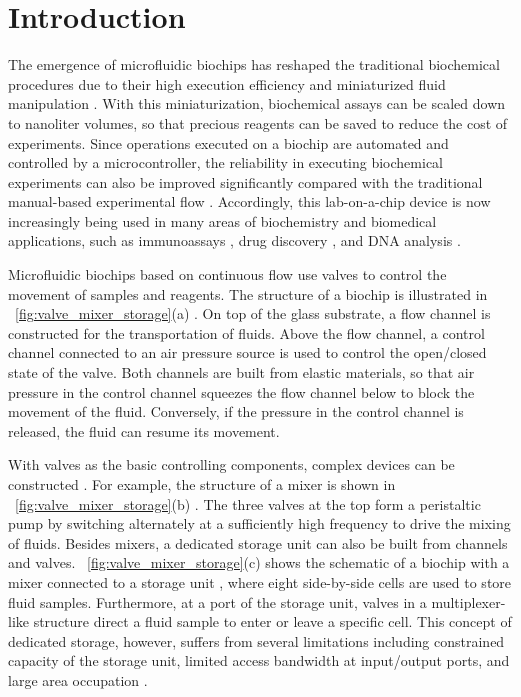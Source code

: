 \section{Introduction}
The emergence of microfluidic biochips has reshaped the traditional biochemical procedures due to their high execution efficiency and miniaturized fluid manipulation \cite{EVNR03,JMSQ07}.
With this miniaturization, biochemical assays can be scaled down to nanoliter volumes,
so that precious reagents can be saved to reduce the cost of experiments.
Since operations executed on a biochip are automated and controlled
by a microcontroller, the reliability in executing biochemical experiments
can also be improved significantly compared with the traditional
manual-based experimental flow \cite{hu2017computer}. Accordingly, this lab-on-a-chip device is now increasingly being used in many areas of biochemistry and biomedical applications, such as immunoassays \cite{kartalov2006high}, drug discovery \cite{einav2008discovery}, and DNA analysis \cite{hong2006molecular}.

Microfluidic biochips based on continuous flow use valves
to control the movement of samples and reagents.  The structure of a biochip
is illustrated in \figname~\ref{fig:valve_mixer_storage}(a) \cite{zhu2018multi}.
On top of the glass substrate, a flow channel is constructed for the transportation of fluids.
Above the flow channel, a control channel connected to an air pressure source is used to control the open/closed state of the valve. Both channels are built from elastic materials, so that air pressure
in the control channel squeezes the flow channel below to block the movement
of the fluid. Conversely, if the pressure in the control channel is released,
the fluid can resume its movement.

With valves as the basic controlling components, complex devices can
be constructed \cite{squires2005microfluidics}. For example,
the structure of a mixer is shown in \figname~\ref{fig:valve_mixer_storage}(b) \cite{HuDHC17}. The
three valves at the top form a peristaltic pump by switching alternately at a
sufficiently high frequency to drive the mixing of fluids.
Besides mixers, a dedicated storage unit can also be built from channels and
valves. \figname~\ref{fig:valve_mixer_storage}(c) shows the schematic
of a biochip with a mixer connected to a storage unit \cite{AminTA09}, where eight side-by-side cells are used to store fluid samples. Furthermore, at a port of the storage unit, valves in a multiplexer-like structure direct a fluid sample to enter or leave a specific cell. This concept of dedicated storage, however, suffers from several limitations including constrained capacity of the storage unit, limited access bandwidth at input/output ports, and large area occupation \cite{Chen2019DCSA}.

